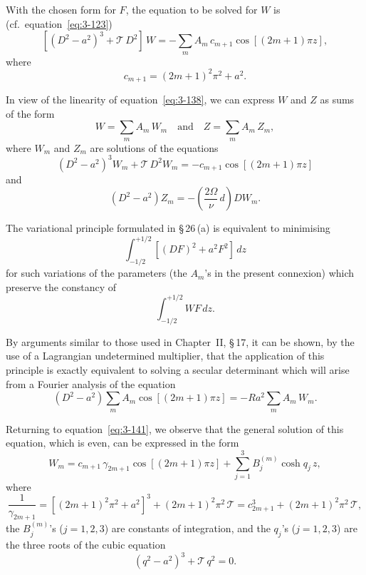 With the chosen form for $F$, the equation to be solved for $W$ is (cf.\ equation~\eqref{eq:3-123})
\begin{equation}\label{eq:3-138}
[(D^2 - a^2)^3 + \mathscr{T}\,D^2]\,W = -\sum_m A_m\, c_{m+1}\cos[(2m+1)\pi z],
\end{equation}
where
\begin{equation}\label{eq:3-139}
c_{m+1} = (2m+1)^2\pi^2 + a^2.
\end{equation}

In view of the linearity of equation~\eqref{eq:3-138}, we can express $W$ and $Z$ as sums of the form
\begin{equation}\label{eq:3-140}
W = \sum_m A_m\, W_m \quad \text{and} \quad Z = \sum_m A_m\, Z_m,
\end{equation}
where $W_m$ and $Z_m$ are solutions of the equations
\begin{equation}\label{eq:3-141}
(D^2 - a^2)^3 W_m + \mathscr{T}\,D^2 W_m = -c_{m+1}\cos[(2m+1)\pi z]
\end{equation}
and
\begin{equation}\label{eq:3-142}
(D^2 - a^2)Z_m = -\left(\frac{2\Omega}{\nu}\,d\right)\!DW_m.
\end{equation}

The variational principle formulated in \S\,26\,(a) is equivalent to minimising
\begin{equation}\label{eq:3-143}
\int_{-1/2}^{+1/2} [(DF)^2 + a^2 F^2]\,dz
\end{equation}
for such variations of the parameters (the $A_m$'s in the present connexion) which preserve the constancy of
\begin{equation}\label{eq:3-144}
\int_{-1/2}^{+1/2} WF\,dz.
\end{equation}

By arguments similar to those used in Chapter~II, \S\,17, it can be shown, by the use of a Lagrangian undetermined multiplier, that the application of this principle is exactly equivalent to solving a secular determinant which will arise from a Fourier analysis of the equation
\begin{equation}\label{eq:3-145}
(D^2 - a^2)\sum_m A_m\cos[(2m+1)\pi z] = -Ra^2\sum_m A_m\, W_m.
\end{equation}

Returning to equation~\eqref{eq:3-141}, we observe that the general solution of this equation, which is even, can be expressed in the form
\begin{equation}\label{eq:3-146}
W_m = c_{m+1}\,\gamma_{2m+1}\cos[(2m+1)\pi z] + \sum_{j=1}^{3} B_j^{(m)}\cosh q_j\, z,
\end{equation}
where
\begin{equation}\label{eq:3-147}
\frac{1}{\gamma_{2m+1}} = [(2m+1)^2\pi^2 + a^2]^3 + (2m+1)^2\pi^2\,\mathscr{T} = c_{2m+1}^3 + (2m+1)^2\pi^2\,\mathscr{T},
\end{equation}
the $B_j^{(m)}$'s ($j = 1,2,3$) are constants of integration, and the $q_j$'s ($j = 1,2,3$) are the three roots of the cubic equation
\begin{equation}\label{eq:3-148}
(q^2 - a^2)^3 + \mathscr{T}\,q^2 = 0.
\end{equation}

